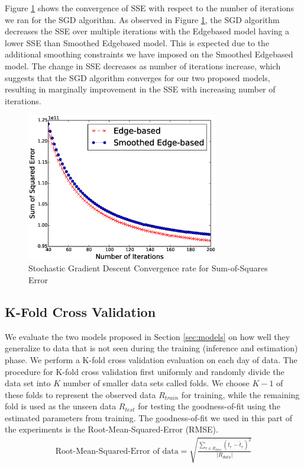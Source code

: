\documentclass{sig-alternate}
\begin{document}
Figure \ref{fig:convergence} shows the convergence of SSE with respect to the number of iterations we ran for the SGD algorithm. %
As observed in Figure \ref{fig:convergence}, the SGD algorithm decreases the SSE over multiple iterations with the Edgebased model having a lower SSE than Smoothed Edgebased model. This is expected due to the additional smoothing constraints we have imposed on the Smoothed Edgebased model. The change in SSE decreases as number of iterations increase, which suggests that the SGD algorithm converges for our two proposed models, resulting in marginally improvement in the SSE with increasing number of iterations.
\begin{figure}[htb]
	\centering
	\includegraphics[width=3.3in]{convergence}
	\caption{Stochastic Gradient Descent Convergence rate for Sum-of-Squares Error}
	\label{fig:convergence}
\end{figure}

\subsection{K-Fold Cross Validation}

We evaluate the two models proposed in Section \ref{sec:models} on how well they generalize to data that is not seen during the training (inference and estimation) phase. We perform a K-fold cross validation evaluation on each day of data. The procedure for K-fold cross validation first uniformly and randomly divide the data set into $K$ number of smaller data sets called folds. We choose $K-1$ of these folds to represent the observed data $R_{train}$ for training, while the remaining fold is used as the unseen data $R_{test}$ for testing the goodness-of-fit using the estimated parameters from training. The goodness-of-fit we used in this part of the experiments is the Root-Mean-Squared-Error (RMSE).
\begin{align*}
	\text{Root-Mean-Squared-Error of data} = \sqrt{\frac{\sum_{r \in R_{data}} (t_r - \hat{t}_r)^2}{|R_{data}|}}
\end{align*}
\end{document}
